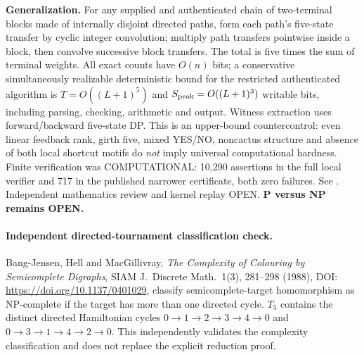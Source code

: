 \documentclass[11pt]{article}
\begin{document}
\noindent\textbf{Generalization.}
For any supplied and authenticated chain of
two-terminal blocks made of internally disjoint directed
paths, form each path's five-state transfer by cyclic
integer convolution; multiply path transfers pointwise
inside a block, then convolve successive block transfers.
The total is five times the sum of terminal weights.
All exact counts have $O(n)$ bits; a conservative
simultaneously realizable deterministic bound for the
restricted authenticated algorithm is
$T=O((L+1)^5)$ and
$S_{\rm peak}=O((L+1)^3)$ writable bits, including
parsing, checking, arithmetic and output.
Witness extraction uses forward/backward five-state DP.
This is an upper-bound countercontrol: even linear
feedback rank, girth five, mixed YES/NO, noncactus
structure and absence of both local shortcut motifs do
\emph{not} imply universal computational hardness.
Finite verification was COMPUTATIONAL: 10,290
assertions in the full local verifier and 717 in the
published narrower certificate, both zero failures.
See
.
Independent mathematics review and kernel replay OPEN.
\textbf{P versus NP remains OPEN.}

\paragraph{Independent directed-tournament classification check.}
Bang-Jensen, Hell and MacGillivray,
\emph{The Complexity of Colouring by Semicomplete Digraphs},
SIAM J.\ Discrete Math.\ 1(3), 281--298 (1988),
DOI: \url{https://doi.org/10.1137/0401029},
classify semicomplete-target homomorphism as NP-complete
if the target has more than one directed cycle.
$T_5$ contains the distinct directed Hamiltonian cycles
$0\to1\to2\to3\to4\to0$ and
$0\to3\to1\to4\to2\to0$.
This independently validates the complexity classification
and does not replace the explicit reduction proof.
\end{document}
